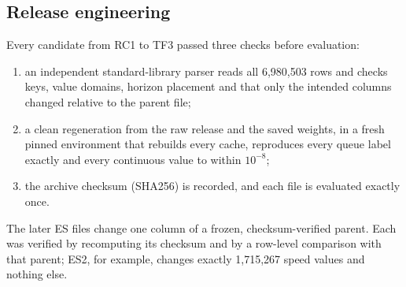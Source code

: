 \subsection{Release engineering}
Every candidate from RC1 to TF3 passed three checks before evaluation:
\begin{enumerate}
  \item an independent standard-library parser reads all 6,980,503 rows and checks keys, value domains, horizon
        placement and that only the intended columns changed relative to the parent file;
  \item a clean regeneration from the raw release and the saved weights, in a fresh pinned environment that rebuilds
        every cache, reproduces every queue label exactly and every continuous value to within $10^{-8}$;
  \item the archive checksum (SHA256) is recorded, and each file is evaluated exactly once.
\end{enumerate}
The later ES files change one column of a frozen, checksum-verified parent. Each was verified by recomputing its
checksum and by a row-level comparison with that parent; ES2, for example, changes exactly 1,715,267 speed values and
nothing else.
